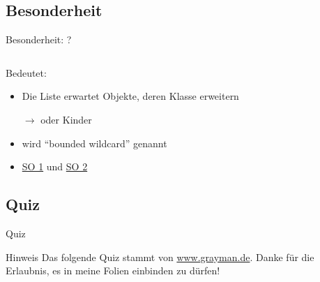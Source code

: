 \documentclass[usepdftitle=false,hyperref={pdfpagelabels=false}]{beamer}
\begin{document}
\subsection{Besonderheit}
\begin{frame}{Besonderheit: ?}
    \inputminted[linenos=false, numbersep=5pt, tabsize=4, fontsize=\small, firstnumber=1, firstline=1, lastline=1]{java}{SingleLines.java}
    Bedeutet:
    \begin{itemize}[<+->]
        \item Die Liste erwartet Objekte, deren Klasse  erweitern
        \item[$\rightarrow$]  oder Kinder
        \item {} wird "`bounded wildcard"' genannt
        \item \href{http://stackoverflow.com/a/3009779/562769}{SO 1} und \href{http://stackoverflow.com/a/1840022/562769}{SO 2}
    \end{itemize}
\end{frame}

\subsection{Quiz}
\begin{frame}{Quiz}
    \begin{block}{Hinweis}
        Das folgende Quiz stammt von \href{http://www.grayman.de/quiz/java-generics-en.quiz}{www.grayman.de}.
        Danke für die Erlaubnis, es in meine Folien einbinden zu
        dürfen!
    \end{block}
\end{frame}
\end{document}
